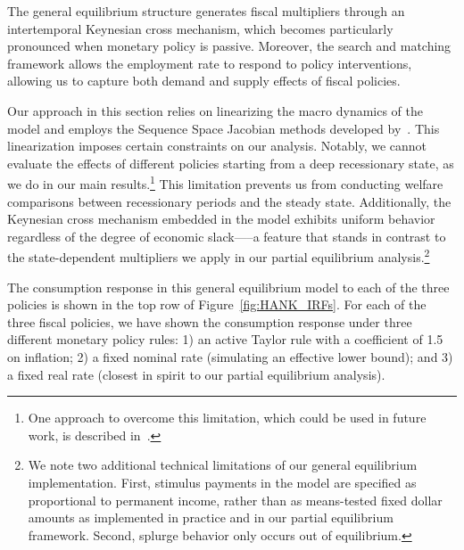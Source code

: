 \documentclass{econsocart}
\begin{document}
The general equilibrium structure generates fiscal multipliers through an intertemporal Keynesian cross mechanism, which becomes particularly pronounced when monetary policy is passive. Moreover, the search and matching framework allows the employment rate to respond to policy interventions, allowing us to capture both demand and supply effects of fiscal policies.

Our approach in this section relies on linearizing the macro dynamics of the model and employs the Sequence Space Jacobian methods developed by~\cite{Auclert2021}. This linearization imposes certain constraints on our analysis. Notably, we cannot evaluate the effects of different policies starting from a deep recessionary state, as we do in our main results.\footnote{One approach to overcome this limitation, which could be used in future work, is described in~\cite{bkmMitShocks}.} This limitation prevents us from conducting welfare comparisons between recessionary periods and the steady state. Additionally, the Keynesian cross mechanism embedded in the model exhibits uniform behavior regardless of the degree of economic slack—--a feature that stands in contrast to the state-dependent multipliers we apply in our partial equilibrium analysis.\footnote{We note two additional technical limitations of our general equilibrium implementation. First, stimulus payments in the model are specified as proportional to permanent income, rather than as means-tested fixed dollar amounts as implemented in practice and in our partial equilibrium framework. Second, splurge behavior only occurs out of equilibrium.}

The consumption response in this general equilibrium model to each of the three policies is shown in the top row of Figure~\ref{fig:HANK_IRFs}. For each of the three fiscal policies, we have shown the consumption response under three different monetary policy rules: 1) an active Taylor rule with a coefficient of 1.5 on inflation; 2) a fixed nominal rate (simulating an effective lower bound); and 3) a fixed real rate (closest in spirit to our partial equilibrium analysis).



\end{document}

